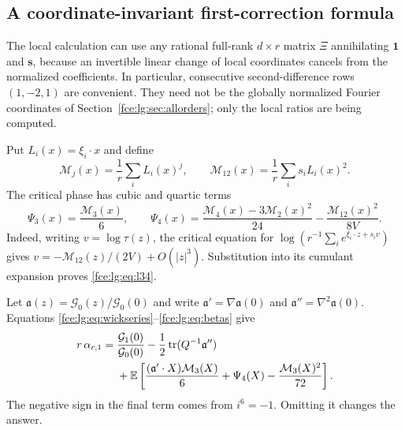 \documentclass[11pt,a4paper]{article}
\numberwithin{equation}{section}
\theoremstyle{definition}\newtheorem{definition}[theorem]{Definition}
\theoremstyle{remark}\newtheorem{remark}[theorem]{Remark}
\newcommand{\Exp}{\mathbb E}
\newcommand{\one}{\boldsymbol 1}
\DeclareMathOperator{\tr}{tr}
\begin{document}
\subsection{A coordinate-invariant first-correction formula}
The local calculation can use any rational full-rank $d\times r$ matrix
$\Xi$ annihilating $\one$ and $\boldsymbol s$, because an invertible
linear change of local coordinates cancels from the normalized
coefficients. In particular, consecutive second-difference rows $(1,-2,1)$
are convenient. They need not be the globally normalized Fourier
coordinates of Section~\ref{fce:lg:sec:allorders}; only the local ratios
are being computed.

Put $L_i(x)=\xi_i\cdot x$ and define
\[
 \mathcal M_j(x)=\frac1r\sum_iL_i(x)^j,\qquad
 \mathcal M_{12}(x)=\frac1r\sum_i s_iL_i(x)^2.
\]
The critical phase has cubic and quartic terms
\begin{equation}\label{fce:lg:eq:l34}
 \Psi_3(x)=\frac{\mathcal M_3(x)}6,\qquad
 \Psi_4(x)=\frac{\mathcal M_4(x)-3\mathcal M_2(x)^2}{24}
              -\frac{\mathcal M_{12}(x)^2}{8V}.
\end{equation}
Indeed, writing $v=\log\tau(z)$, the critical equation for
$\log(r^{-1}\sum_i e^{\xi_i\cdot z+s_iv})$ gives
$v=-\mathcal M_{12}(z)/(2V)+O(|z|^3)$. Substitution into its cumulant
expansion proves \eqref{fce:lg:eq:l34}.

Let $\mathfrak a(z)=\mathcal G_0(z)/\mathcal G_0(0)$ and write
$\mathfrak a'=\nabla\mathfrak a(0)$ and
$\mathfrak a''=\nabla^2\mathfrak a(0)$. Equations
\eqref{fce:lg:eq:wickseries}--\eqref{fce:lg:eq:betas} give
\begin{align}\label{fce:lg:eq:d1}
 r\,\alpha_{r,1}={}&\frac{\mathcal G_1(0)}{\mathcal G_0(0)}
 -\frac12\tr(Q^{-1}\mathfrak a'')\notag\\
 &+\Exp\left[\frac{(\mathfrak a'\cdot X)\mathcal M_3(X)}6
             +\Psi_4(X)-\frac{\mathcal M_3(X)^2}{72}\right].
\end{align}
The negative sign in the final term comes from $i^6=-1$. Omitting it
changes the answer.
\end{document}
